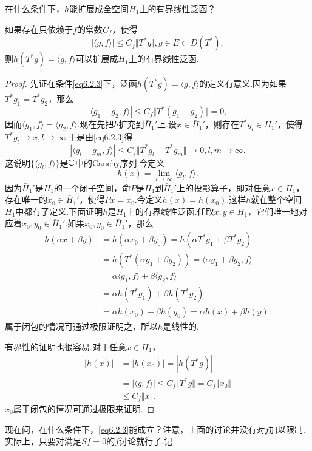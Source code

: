 在什么条件下，$h$能扩展成全空间$H_1$上的有界线性泛函？
\begin{prop}\label{prop6.2.2}
	如果存在只依赖于$f$的常数$C_f$，使得
	\begin{equation}\label{eq6.2.3}
		|\langle g,f\rangle|\le C_f\Vert T^\ast g\Vert,g\in E\subset D(T^\ast),
	\end{equation}
则$h(T^\ast g)=\langle g,f\rangle$可以扩展成$H_1$上的有界线性泛函.
\end{prop}
\begin{proof}
	先证在条件\eqref{eq6.2.3}下，泛函$h(T^\ast g)=\langle g,f\rangle$的定义有意义.因为如果$T^\ast g_1=T^\ast g_2$，那么
	\[|\langle g_1-g_2,f\rangle|\le C_f\Vert T^\ast(g_1-g_2)\Vert=0,\]
	因而$\langle g_1,f\rangle=\langle g_2,f\rangle$.现在先把$h$扩充到$\bar{H}_1'$上.设$x\in\bar{H}_1'$，则存在$T^\ast g_l\in H_1'$，使得$T^\ast g_l\to x,l\to\infty$.于是由\eqref{eq6.2.3}得
	\[|\langle g_l-g_m,f\rangle|\le C_f\Vert T^\ast g_l-T^\ast g_m\Vert\to0,l,m\to\infty.\]
	这说明$\{\langle g_l,f\rangle\}$是$\mathbb C$中的Cauchy序列.今定义
	\[h(x)=\lim_{l\to\infty}\langle g_l,f\rangle.\]
	因为$\bar{H}_1'$是$H_1$的一个闭子空间，命$P$是$H_1$到$\bar{H}_1'$上的投影算子，即对任意$x\in H_1$，存在唯一的$x_0\in\bar{H}_1'$，使得$Px=x_0$.今定义$h(x)=h(x_0)$.这样$h$就在整个空间$H_1$中都有了定义.下面证明$h$是$H_1$上的有界线性泛函.任取$x,y\in H_1$，它们唯一地对应着$x_0,y_0\in\bar{H}_1'$.如果$x_0,y_0\in\bar{H}_1'$，那么
	\begin{align*}
		h(\alpha x+\beta y)
		&=h(\alpha x_0+\beta y_0)=h(\alpha T^\ast g_1+\beta T^\ast g_2)\\
		&=h(T^\ast(\alpha g_1+\beta g_2))=\langle\alpha g_1+\beta g_2,f\rangle\\
		&=\alpha\langle g_1,f\rangle+\beta\langle g_2,f\rangle\\
		&=\alpha h(T^\ast g_1)+\beta h(T^\ast g_2)\\
		&=\alpha h(x_0)+\beta h(y_0)=\alpha h(x)+\beta h(y).
	\end{align*}
属于闭包的情况可通过极限证明之，所以$h$是线性的.

有界性的证明也很容易.对于任意$x\in H_1$，
\begin{align*}
	|h(x)|
	&=|h(x_0)|=|h(T^\ast g)|\\
	&=|\langle g,f\rangle|\le C_f\Vert T^\ast g\Vert=C_f\Vert x_0\Vert\\
	&\le C_f\Vert x\Vert.
\end{align*}
$x_0$属于闭包的情况可通过极限来证明.
\end{proof}
现在问，在什么条件下，\eqref{eq6.2.3}能成立？注意，上面的讨论并没有对$f$加以限制.实际上，只要对满足$Sf=0$的$f$讨论就行了.记
